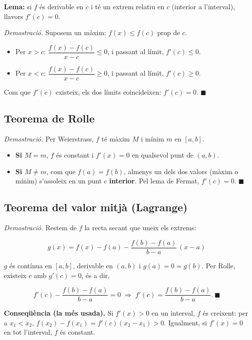 \textbf{Lema:} si $f$ és derivable en $c$ i té un extrem relatiu en $c$ (interior a l'interval), llavors $f'(c)=0$.

\emph{Demostració.} Suposem un màxim: $f(x)\le f(c)$ prop de $c$.

\begin{itemize}
\item Per $x>c$: $\dfrac{f(x)-f(c)}{x-c}\le0$, i passant al límit, $f'(c)\le0$.
\item Per $x<c$: $\dfrac{f(x)-f(c)}{x-c}\ge0$, i passant al límit, $f'(c)\ge0$.
\end{itemize}

Com que $f'(c)$ existeix, els dos límits coincideixen: $f'(c)=0$. $\blacksquare$

\subsection{Teorema de Rolle}

\emph{Demostració.} Per Weierstrass, $f$ té màxim $M$ i mínim $m$ en $[a,b]$.

\begin{itemize}
\item \textbf{Si $M=m$}, $f$ és constant i $f'(x)=0$ en qualsevol punt de $(a,b)$.
\item \textbf{Si $M\neq m$}, com que $f(a)=f(b)$, almenys un dels dos valors (màxim o mínim) s'assoleix en un punt $c$ \textbf{interior}. Pel lema de Fermat, $f'(c)=0$. $\blacksquare$
\end{itemize}

\subsection{Teorema del valor mitjà (Lagrange)}

\emph{Demostració.} Restem de $f$ la recta secant que uneix els extrems:

\begin{equation*}
g(x)=f(x)-f(a)-\frac{f(b)-f(a)}{b-a}\,(x-a)
\end{equation*}

$g$ és contínua en $[a,b]$, derivable en $(a,b)$ i $g(a)=0=g(b)$. Per Rolle, existeix $c$ amb $g'(c)=0$, és a dir,

\begin{equation*}
f'(c)-\frac{f(b)-f(a)}{b-a}=0\;\Longrightarrow\;f'(c)=\frac{f(b)-f(a)}{b-a}.\ \blacksquare
\end{equation*}

\textbf{Conseqüència (la més usada).} Si $f'(x)>0$ en un interval, $f$ és creixent: per a $x_1<x_2$, $f(x_2)-f(x_1)=f'(c)(x_2-x_1)>0$. Igualment, si $f'(x)=0$ en tot l'interval, $f$ és constant.

